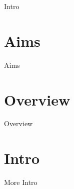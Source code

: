 Intro 

\section[Aims and Overview]{Aims}
\label{invisible:aimsoverview}

Aims

\section*{Overview}

Overview

\section{Intro}
\label{sec:intro2}

More Intro 